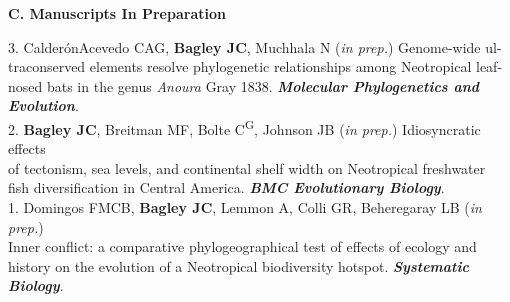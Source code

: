 \documentclass[margin,line]{res}
\begin{document}
\begin{resume}
\textbf{C. Manuscripts In Preparation}%

3. Calder\'{o}n\textendash Acevedo CA{G}, \textbf{Bagley JC}, Muchhala N (\emph{in prep.}) Genome-wide ul-\\
\hspace*{8mm} traconserved elements resolve phylogenetic relationships among Neotropical leaf-\\
\hspace*{8mm} nosed bats in the genus \emph{Anoura} Gray 1838. {\it \textbf{Molecular Phylogenetics and}\\ \vspace{2mm}
\hspace*{8mm}\textbf{Evolution}}.  \\
2. \textbf{Bagley JC}, Breitman MF, Bolte C\textsuperscript{G}, Johnson JB (\emph{in prep.}) Idiosyncratic effects\\
\hspace*{8mm} of tectonism, sea levels, and continental shelf width on Neotropical freshwater\\ \vspace{2mm}
\hspace*{8mm}fish diversification in Central America. {\it \textbf{BMC Evolutionary Biology}}.  \\
1. Domingos FMCB, \textbf{Bagley JC}, Lemmon A, Colli GR, Beheregaray LB (\emph{in prep.})\\
\hspace*{8mm} Inner conflict: a comparative phylogeographical test of effects of ecology and\\
\hspace*{8mm} history on the evolution of a Neotropical biodiversity hotspot. {\it \textbf{Systematic}\\
\hspace*{8mm} \textbf{Biology}}.



\end{resume}
\end{document}
